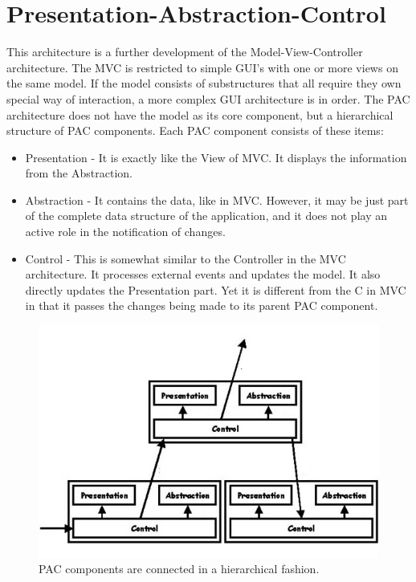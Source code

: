 \documentclass{article}
\begin{document}
\section{Presentation-Abstraction-Control}

This architecture is a further development of the Model-View-Controller architecture. The MVC is restricted to simple GUI's with one or more views on the same model. If the model consists of substructures that all require they own special way of interaction, a more complex GUI architecture is in order. The PAC architecture does not have the model as its core component, but a hierarchical structure of PAC components. Each PAC component consists of these items:

\begin{itemize}

\item Presentation - It is exactly like the View of MVC. It displays the information from the Abstraction.
\item Abstraction - It contains the data, like in MVC. However, it may be just part of the complete data structure of the application, and it does not play an active role in the notification of changes.
\item Control - This is somewhat similar to the Controller in the MVC architecture. It processes external events and updates the model. It also directly updates the Presentation part. Yet it is different from the C in MVC in that it passes the changes being made to its parent PAC component.



\end{itemize}

\begin{figure}[h]
\centering
\includegraphics[scale=0.65]{pac.jpg}
\caption{PAC components are connected in a hierarchical fashion.}
\label{fig_pac}
\end{figure}
\end{document}
